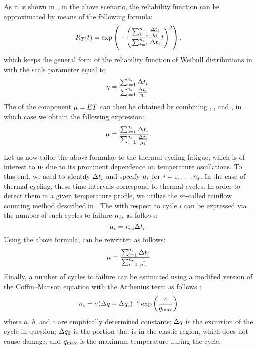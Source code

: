 As it is shown in \cite{xiang2010}, in the above scenario, the reliability
function can be approximated by means of the following formula:
\[
  R_T(t) = \exp\left(-\left( \frac{\sum_{i = 1}^{n_\mathrm{s}} \frac{\Delta t_i}{\eta_i}}{\sum_{i = 1}^{n_\mathrm{s}} \Delta t_i} t \right)^\beta\right),
\]
which keeps the general form of the reliability function of Weibull
distributions in  with the scale parameter equal to
\begin{equation} \elab{reliability-scale}
  \scale = \frac{\sum_{i = 1}^\ns \dt_i}{\sum_{i = 1}^\ns \frac{\Delta t_i}{\scale_i}}.
\end{equation}
The  of the component $\mu = E T$ can then be obtained by
combining , , and
, in which case we obtain the following expression:
\begin{equation} \elab{reliability-mean-time}
  \mean = \frac{\sum_{i = 1}^\ns \dt_i}{\sum_{i = 1}^\ns \frac{\Delta t_i}{\mean_i}}.
\end{equation}

Let us now tailor the above formulae to the thermal-cycling fatigue, which is of
interest to us due to its prominent dependence on temperature oscillations. To
this end, we need to identify $\Delta t_i$ and specify $\mu_i$ for $i =
1, \dots, {n_\mathrm{s}}$. In the case of thermal cycling, these time intervals correspond
to thermal cycles. In order to detect them in a given temperature profile, we
utilize the so-called rainflow counting method described in \cite{xiang2010}.
The  with respect to cycle $i$ can be expressed via the number of such
cycles to failure ${n_\mathrm{c}}_i$ as follows:
\[
  \mu_i = {n_\mathrm{c}}_i \Delta t_i.
\]
Using the above formula,  can be rewritten as
follows:
\begin{equation} \elab{lifetime-thermal-cycling}
  \mean = \frac{\sum_{i = 1}^\ns \dt_i}{\sum_{i = 1}^\ns \frac{1}{\nc_i}}
\end{equation}
Finally, a number of cycles to failure can be estimated using a modified version
of the Coffin--Manson equation with the Arrhenius term as follows
\cite{xiang2010, jedec2010}:
\begin{equation} \elab{reliability-mean-cycles}
  \nc = a (\Delta \q - \Delta \q_0)^{-b} \exp\left(\frac{c}{\q_\maximum}\right)
\end{equation}
where $a$, $b$, and $c$ are empirically determined constants; $\Delta q$ is the
excursion of the cycle in question; $\Delta q_0$ is the portion that is in the
elastic region, which does not cause damage; and $q_{\mathrm{max}}$ is the maximum
temperature during the cycle.

